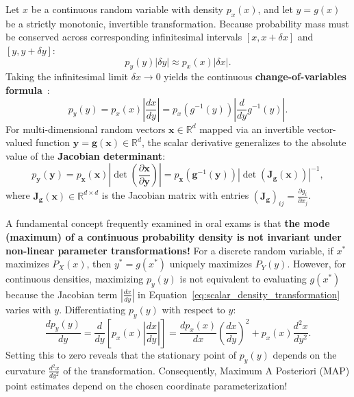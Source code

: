 Let $x$ be a continuous random variable with density $p_x(x)$, and let $y = g(x)$ be a strictly monotonic, invertible transformation. Because probability mass must be conserved across corresponding infinitesimal intervals $[x, x + \delta x]$ and $[y, y + \delta y]$:
\begin{equation}
p_y(y) |\delta y| \approx p_x(x) |\delta x|.
\end{equation}
Taking the infinitesimal limit $\delta x \to 0$ yields the continuous \textbf{change-of-variables formula}~\cite{bishop2024deep}:
\begin{equation}
p_y(y) = p_x(x) \left| \frac{dx}{dy} \right| = p_x(g^{-1}(y)) \left| \frac{d}{dy} g^{-1}(y) \right|.
\label{eq:scalar_density_transformation}
\end{equation}
For multi-dimensional random vectors $\mathbf{x} \in \mathbb{R}^d$ mapped via an invertible vector-valued function $\mathbf{y} = \mathbf{g}(\mathbf{x}) \in \mathbb{R}^d$, the scalar derivative generalizes to the absolute value of the \textbf{Jacobian determinant}:
\begin{equation}
p_{\mathbf{y}}(\mathbf{y}) = p_{\mathbf{x}}(\mathbf{x}) \left| \det \left( \frac{\partial \mathbf{x}}{\partial \mathbf{y}} \right) \right| = p_{\mathbf{x}}(\mathbf{g}^{-1}(\mathbf{y})) \left| \det \left( \mathbf{J}_{\mathbf{g}}(\mathbf{x}) \right) \right|^{-1},
\label{eq:multivariate_density_transformation}
\end{equation}
where $\mathbf{J}_{\mathbf{g}}(\mathbf{x}) \in \mathbb{R}^{d \times d}$ is the Jacobian matrix with entries $(\mathbf{J}_{\mathbf{g}})_{ij} = \frac{\partial g_i}{\partial x_j}$.

\begin{examinsight}
A fundamental concept frequently examined in oral exams is that \textbf{the mode (maximum) of a continuous probability density is not invariant under non-linear parameter transformations!}
For a discrete random variable, if $x^*$ maximizes $P_X(x)$, then $y^* = g(x^*)$ uniquely maximizes $P_Y(y)$. 
However, for continuous densities, maximizing $p_y(y)$ is not equivalent to evaluating $g(x^*)$ because the Jacobian term $\left| \frac{dx}{dy} \right|$ in Equation~\eqref{eq:scalar_density_transformation} varies with $y$. Differentiating $p_y(y)$ with respect to $y$:
\begin{equation}
\frac{d p_y(y)}{dy} = \frac{d}{dy} \left[ p_x(x) \left| \frac{dx}{dy} \right| \right] = \frac{d p_x(x)}{dx} \left( \frac{dx}{dy} \right)^2 + p_x(x) \frac{d^2 x}{dy^2}.
\end{equation}
Setting this to zero reveals that the stationary point of $p_y(y)$ depends on the curvature $\frac{d^2 x}{dy^2}$ of the transformation. Consequently, Maximum A Posteriori (MAP) point estimates depend on the chosen coordinate parameterization!
\end{examinsight}

